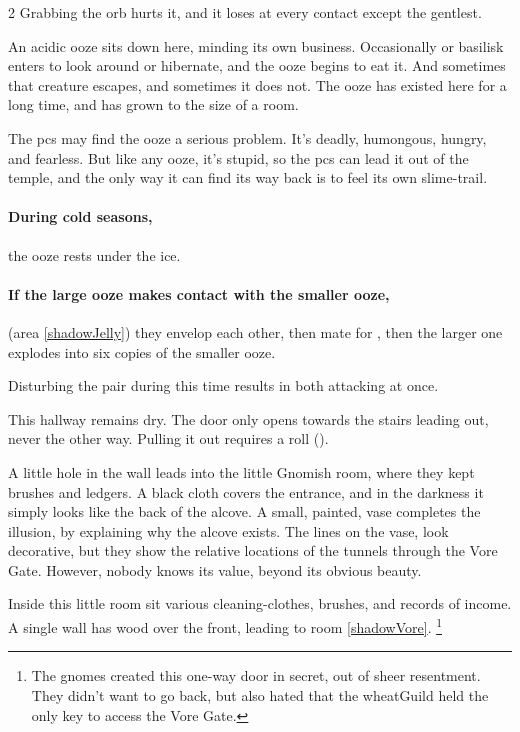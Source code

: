 \begin{multicols}{2}
Grabbing the orb hurts it, and it loses  at every contact except the gentlest.


An acidic ooze sits down here, minding its own business.
Occasionally  or \gls{basilisk} enters to look around or hibernate, and the ooze begins to eat it.
And sometimes that creature escapes, and sometimes it does not.
The ooze has existed here for a long time, and has grown to the size of a room.

\uncommonlyLargeJelly

The \glspl{pc} may find the ooze a serious problem.
It's deadly, humongous, hungry, and fearless.
But like any ooze, it's stupid, so the \glspl{pc} can lead it out of the temple, and the only way it can find its way back is to feel its own slime-trail.

\paragraph{During cold seasons,}
the ooze rests under the ice.

\paragraph{If the large ooze makes contact with the smaller ooze,}
(area \vref{shadowJelly})
they envelop each other, then mate for , then the larger one explodes into six copies of the smaller ooze.

Disturbing the pair during this time results in both attacking at once.


This hallway remains dry.
The door only opens towards the stairs leading out, never the other way.
Pulling it out requires a  roll (\tn[11]).

A little hole in the wall leads into the little Gnomish room, where they kept brushes and ledgers.
A black cloth covers the entrance, and in the darkness it simply looks like the back of the alcove.
A small, painted, vase completes the illusion, by explaining why the alcove exists.
The lines on the vase, look decorative, but they show the relative locations of the tunnels through the Vore Gate.
However, nobody knows its value, beyond its obvious beauty.


Inside this little room sit various cleaning-clothes, brushes, and records of income.
A single wall has wood over the front, leading to room \vref{shadowVore}.%
\footnote{The gnomes created this one-way door in secret, out of sheer resentment.
They didn't want to go back, but also hated that the \gls{wheatGuild} held the only key to access the Vore Gate.}


\end{multicols}
